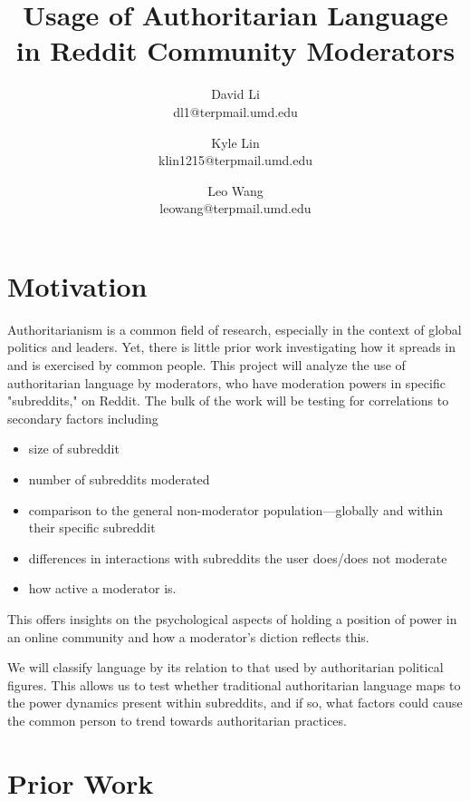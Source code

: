 \documentclass[letterpaper,twocolumn,10pt]{article}
\title{\Large \bf Usage of Authoritarian Language in Reddit Community Moderators}
\author{ %
{\rm David Li}\\
dl1@terpmail.umd.edu
\and
{\rm Kyle Lin}\\
klin1215@terpmail.umd.edu
\and
{\rm Leo Wang}\\
leowang@terpmail.umd.edu
}
\date{}
\begin{document}
\maketitle

\section{Motivation}


Authoritarianism is a common field of research, especially in the context of global politics and leaders. Yet, there is little prior work investigating how it spreads in and is exercised by common people. This project will analyze the use of authoritarian language by moderators, who have moderation powers in specific "subreddits," on Reddit. The bulk of the work will be testing for correlations to secondary factors including \begin{itemize}
    \item size of subreddit
    \item number of subreddits moderated
    \item comparison to the general non-moderator population---globally and within their specific subreddit
    \item differences in interactions with subreddits the user does/does not moderate
    \item how active a moderator is.
\end{itemize} This offers insights on the psychological aspects of holding a position of power in an online community and how a moderator's diction reflects this.

We will classify language by its relation to that used by authoritarian political figures. This allows us to test whether traditional authoritarian language maps to the power dynamics present within subreddits, and if so, what factors could cause the common person to trend towards authoritarian practices.

\section{Prior Work}
\end{document}
